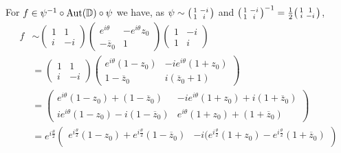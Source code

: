 \documentclass[a4paper,english]{article}
\begin{document}
\begin{pr}
    For $f \in \psi^{-1} \circ \operatorname{Aut}(\operatorname{\mathbb{D}}) \circ \psi$ we have, as $\psi \sim \begin{psmallmatrix} 1 & -i \\ 1 & i \end{psmallmatrix}$ and $\begin{psmallmatrix} 1 & -i \\ 1 & i \end{psmallmatrix}^{-1} = \frac{1}{2} \begin{psmallmatrix} 1 & 1 \\ i & - i \end{psmallmatrix}$,
    \begin{align*}
        f
        & \sim \begin{pmatrix}
            1 & 1 \\ i & - i
        \end{pmatrix}
        \begin{pmatrix}
            e^{i \theta} & - e^{i \theta} z_0 \\ - \overline{z}_0 & 1
        \end{pmatrix}
        \begin{pmatrix}
            1 & -i \\ 1 & i
        \end{pmatrix} \\
        & = \begin{pmatrix}
            1 & 1 \\ i & - i
        \end{pmatrix}
        \begin{pmatrix}
            e^{i \theta} (1 - z_0) & -i e^{i \theta} (1 + z_0) \\
            1 - \overline{z}_0 & i (\overline{z}_0 + 1)
        \end{pmatrix} \\
        & = \begin{pmatrix}
            e^{i \theta} (1 - z_0) + (1 - \overline{z}_0) & - i e^{i \theta} (1 + z_0) + i (1 + \overline{z}_0) \\
            i e^{i \theta} (1 - z_0) - i (1 - \overline{z}_0) & e^{i \theta}(1 + z_0) + (1 + \overline{z}_0)
        \end{pmatrix} \\
        & = e^{i \frac{\theta}{2}} \begin{pmatrix}
            e^{i \frac{\theta}{2}} (1 - z_0) + e^{i \frac{\theta}{2}}(1 - \overline{z}_0) & - i (e^{i \frac{\theta}{2}}(1 + z_0) - e^{i \frac{\theta}{2}} (1 + \overline{z}_0) \\

\end{pmatrix}
\end{align*}
\end{pr}
\end{document}
